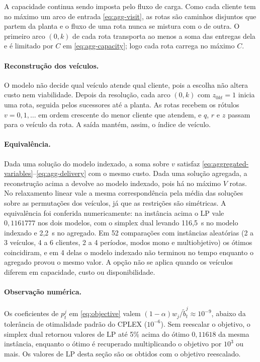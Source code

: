 \documentclass[11pt,a4paper]{article}
\begin{document}
A capacidade continua sendo imposta pelo fluxo de carga. Como cada cliente tem
no máximo um arco de entrada \eqref{eq:agg-visit}, as rotas são caminhos
disjuntos que partem da planta e o fluxo de uma rota nunca se mistura com o de
outra. O primeiro arco $(0,k)$ de cada rota transporta ao menos a soma das
entregas dela e é limitado por $C$ em \eqref{eq:agg-capacity}; logo cada rota
carrega no máximo $C$.

\paragraph{Reconstrução dos veículos.} O modelo não decide qual veículo atende
qual cliente, pois a escolha não altera custo nem viabilidade. Depois da
resolução, cada arco $(0,k)$ com $z_{0kt}=1$ inicia uma rota, seguida pelos
sucessores até a planta. As rotas recebem os rótulos $v=0,1,\ldots$ em ordem
crescente do menor cliente que atendem, e $q$, $r$ e $z$ passam para o veículo
da rota. A saída mantém, assim, o índice de veículo.

\paragraph{Equivalência.} Dada uma solução do modelo indexado, a soma sobre
$v$ satisfaz \eqref{eq:aggregated-variables}--\eqref{eq:agg-delivery} com o mesmo
custo. Dada uma solução agregada, a reconstrução acima a devolve ao modelo
indexado, pois há no máximo $V$ rotas. No relaxamento linear vale a mesma
correspondência pela média das soluções sobre as permutações dos veículos, já
que as restrições são simétricas. A equivalência foi conferida numericamente:
na instância acima o LP vale $0{,}1161777$ nos dois modelos, com o simplex dual
levando 116,5~s no modelo indexado e 2,2~s no agregado. Em 52 comparações com
instâncias aleatórias (2 a 3 veículos, 4 a 6 clientes, 2 a 4 períodos, modos
mono e multiobjetivo) os ótimos coincidiram, e em 4 delas o modelo indexado
não terminou no tempo enquanto o agregado provou o mesmo valor. A opção não se
aplica quando os veículos diferem em capacidade, custo ou disponibilidade.

\paragraph{Observação numérica.} Os coeficientes de $p_t^j$ em
\eqref{eq:objective} valem $(1-\alpha)w_j/\widetilde b_t^j\approx10^{-9}$, abaixo
da tolerância de otimalidade padrão do CPLEX ($10^{-6}$). Sem reescalar o
objetivo, o simplex dual retornou valores de LP até 5\% acima do ótimo
$0{,}11618$ da mesma instância, enquanto o ótimo é recuperado multiplicando o
objetivo por $10^{3}$ ou mais. Os valores de LP desta seção são os obtidos
com o objetivo reescalado.
\end{document}
